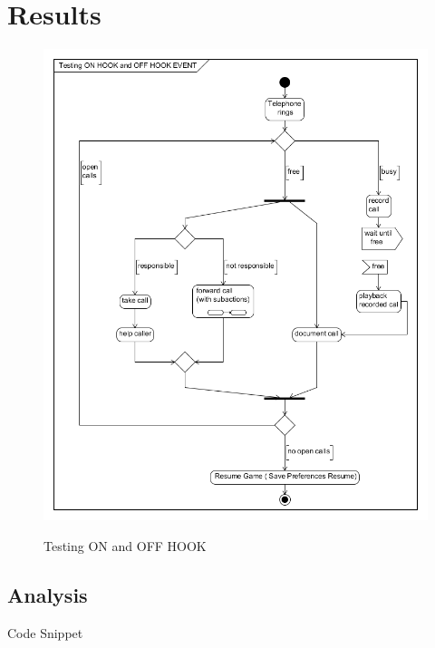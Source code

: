 \section{Results}
\begin{figure} [ht]
\centering
\includegraphics[scale=0.5]{testingcall}\\
\caption{Testing ON and OFF HOOK  }
\label{the-label-for-cross-referencing}
\end{figure}

\subsection{Analysis}
Code Snippet


